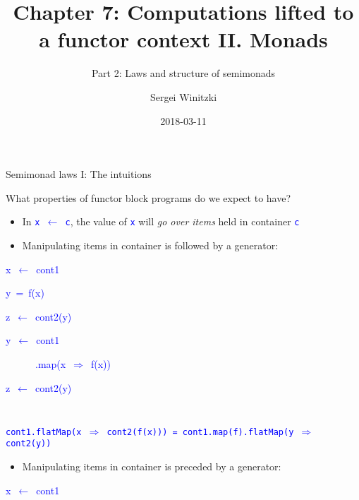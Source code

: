 \documentclass[english]{beamer}
\title[Chapter 7: Functor-lifted computations II]{Chapter 7: Computations lifted to a functor context II. Monads}
\subtitle{Part 2: Laws and structure of semimonads}
\author{Sergei Winitzki}
\date{2018-03-11}
\institute[ABTB]{Academy by the Bay}
\newenvironment{lyxcode}
   {\par\begin{list}{}{
     \setlength{\rightmargin}{\leftmargin}
     \setlength{\listparindent}{0pt}%
     \raggedright
     \setlength{\itemsep}{0pt}
     \setlength{\parsep}{0pt}
     \normalfont\ttfamily}%
    \def\{{\char`\{}
    \def\}{\char`\}}
    \def\textasciitilde{\char`\~}
    \item[]}
   {\end{list}}
\begin{document}
\frame{\titlepage}
\begin{frame}{Semimonad laws I: The intuitions}

What properties of functor block programs do we expect to have?
\begin{itemize}
\item In \texttt{\textcolor{blue}{\footnotesize{}x $\leftarrow$ c}}, the
value of \texttt{\textcolor{blue}{\footnotesize{}x}} will \emph{go
over items} held in container \texttt{\textcolor{blue}{\footnotesize{}c}} 
\item Manipulating items in container is followed by a generator:
\end{itemize}
\texttt{\textcolor{blue}{\footnotesize{}}}%
\begin{minipage}[c][1\totalheight][t]{0.49\columnwidth}%
\begin{lyxcode}
\textcolor{blue}{\footnotesize{}x~$\leftarrow$~cont1}{\footnotesize \par}

\textcolor{blue}{\footnotesize{}y~=~f(x)}{\footnotesize \par}

\textcolor{blue}{\footnotesize{}z~$\leftarrow$~cont2(y)}{\footnotesize \par}
\end{lyxcode}
%
\end{minipage}\texttt{\textcolor{blue}{\footnotesize{}\hfill{}}}%
\begin{minipage}[c][1\totalheight][t]{0.4\columnwidth}%
\begin{lyxcode}
\textcolor{blue}{\footnotesize{}y~$\leftarrow$~cont1}{\footnotesize \par}

\textcolor{blue}{\footnotesize{}~~~~~~.map(x~$\Rightarrow$~f(x))}{\footnotesize \par}

\textcolor{blue}{\footnotesize{}z~$\leftarrow$~cont2(y)}{\footnotesize \par}
\end{lyxcode}
%
\end{minipage}\texttt{\textcolor{blue}{\footnotesize{}\hfill{}\medskip{}
}}{\footnotesize \par}

\texttt{\textcolor{blue}{\footnotesize{}cont1.flatMap(x $\Rightarrow$
cont2(f(x))) = cont1.map(f).flatMap(y $\Rightarrow$ cont2(y))}} 
\begin{itemize}
\item Manipulating items in container is preceded by a generator:
\end{itemize}
\texttt{\textcolor{blue}{\footnotesize{}}}%
\begin{minipage}[c][1\totalheight][t]{0.49\columnwidth}%
\begin{lyxcode}
\textcolor{blue}{\footnotesize{}x~$\leftarrow$~cont1}{\footnotesize \par}


\end{lyxcode}
\end{minipage}
\end{frame}
\end{document}
